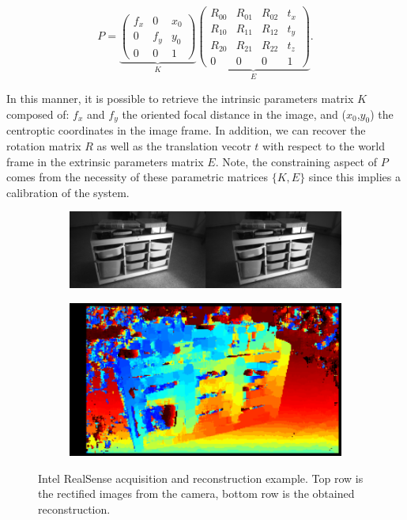 \begin{equation}
	P = \underbrace{\begin{pmatrix}
	f_x & 0 & x_0 \\
	0 & f_y & y_0 \\
	0 & 0 & 1
	\end{pmatrix}}_K \underbrace{\begin{pmatrix}
	R_{00} & R_{01} & R_{02} & t_x \\
	R_{10} & R_{11} & R_{12} & t_y \\
	R_{20} & R_{21} & R_{22} & t_z \\
	0 & 0 & 0 & 1
	\end{pmatrix}}_E.
\end{equation}

In this manner, it is possible to retrieve the intrinsic parameters matrix $K$ composed of: $f_x$ and $f_y$ the oriented focal distance in the image, and ($x_0$,$y_0$) the centroptic coordinates in the image frame. In addition, we can recover the rotation matrix $R$ as well as the translation vecotr $t$ with respect to the world frame in the extrinsic parameters matrix $E$. Note, the constraining aspect of $P$ comes from the necessity of these parametric matrices $\{K,E\}$ since this implies a calibration of the system.

\begin{figure}[h]
	\centering
	\begin{subfigure}{.8\textwidth}
		\centering
		\includegraphics[width=\linewidth]{Figures/SOA/rectified-768x216}
	\end{subfigure}
	\begin{subfigure}{.8\textwidth}
		
		\centering
		\includegraphics[width=\linewidth]{Figures/SOA/ssd-depth-768x432.png}
	\end{subfigure}
	\caption[Intel RealSense acquisition and reconstruction example.]{Intel RealSense acquisition and reconstruction example. Top row is the rectified images from the camera, bottom row is the obtained reconstruction.}
	\label{intel}
\end{figure}

